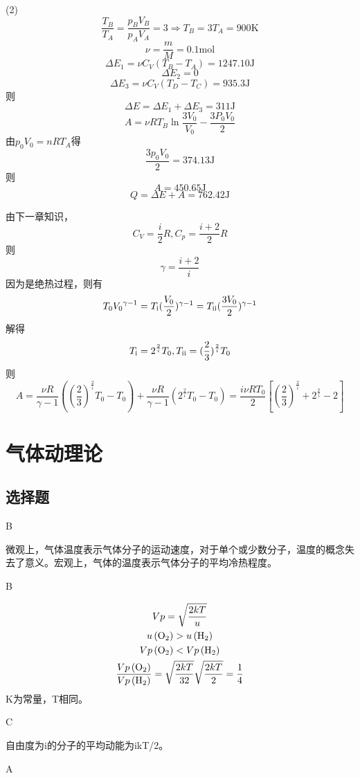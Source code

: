 \documentclass[b5paper,opensource]{./template/qyxf-book}
\newcommand{\RNum}[1]{\uppercase\expandafter{\romannumeral #1\relax}}%
\begin{document}
(2)
\[\frac{{{T_B}}}{{{T_A}}} = \frac{{{p_B}{V_B}}}{{{p_A}{V_A}}} = 3 \Rightarrow {T_B} = 3{T_A} = 900\mathrm{K}\]
\[\nu  = \frac{m}{M} = 0.1\mathrm{mol}\]
\[\Delta {E_1} = \nu {C_V}({T_B} - {T_A}) = 1247.10\mathrm{J}\]
\[\Delta {E_2} = 0\]
\[\Delta {E_3} = \nu {C_V}({T_D} - {T_C}) = 935.3\mathrm{J}\]
则\[\Delta E = \Delta {E_1} + \Delta {E_3} = 311\mathrm{J}\]
\[A = \nu R{T_B}\ln \frac{{3{V_0}}}{{{V_0}}} - \frac{{3P_0V_0}}{2}\]
由${p_0}{V_0} = nR{T_A}$得\[\frac{{3{p_0}{V_0}}}{2} = 374.13\mathrm{J}\]
则\[A = 450.65\mathrm{J}\]
\[Q = \Delta E + A = 762.42\mathrm{J}\]

\solve 由下一章知识，\[{C_V} = \frac{i}{2}R,{C_p} = \frac{{i + 2}}{2}R\]
则
\[\gamma=\frac{{i + 2}}{i}\]
因为是绝热过程，则有
\[{T_0}{V_0}^{\gamma-1}={T_\text{\RNum{1}}}{(\frac{V_0}{2})^{\gamma-1}}= {T_\text{\RNum{2}}}{(\frac{{3{V_0}}}{2})^{\gamma-1}}\]
解得
\[{T_\text{\RNum{1}}} = {2^{\frac{2}{i}}}{T_0},{T_\text{\RNum{2}}} = {(\frac{2}{3})^{\frac{2}{i}}}{T_0}\]
则
\[A = \frac{{\nu R}}{{\gamma-1}}({(\frac{2}{3})^{\frac{2}{i}}}{T_0} - {T_0}) + \frac{{\nu R}}{{\gamma  - 1}}({2^{\frac{2}{i}}}{T_0}-{T_0}) = \frac{{i\nu R{T_0}}}{2}[{(\frac{2}{3})^{\frac{2}{i}}} + {2^{\frac{2}{i}}} - 2]\]

\chapter{气体动理论}
\section{选择题}
B

\solve 微观上，气体温度表示气体分子的运动速度，对于单个或少数分子，温度的概念失去了意义。宏观上，气体的温度表示气体分子的平均冷热程度。

B

\solve
\begin{gather*} 
{Vp=\sqrt{\frac{2kT}{u}}}\\
{u\left(\ce{O2}\right)}>u\left(\ce{H2}\right)\\
{Vp\left(\ce{O2}\right)<Vp\left(\ce{H2}\right) } \\
\frac{Vp\left(\ce{O2}\right)}{Vp\left(\ce{H2}\right)}=\sqrt{\frac{2kT}{32}} \sqrt{\frac{2kT}{2}}=\frac{1}{4}%
\end{gather*}
K为常量，T相同。

C

\solve 自由度为i的分子的平均动能为ikT/2。

A
\end{document}
